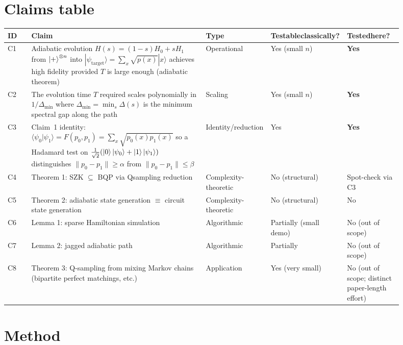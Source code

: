 \documentclass[11pt]{article}
\begin{document}
\section{Claims table}

\begin{longtable}{@{}p{0.06\linewidth}p{0.44\linewidth}p{0.14\linewidth}p{0.12\linewidth}p{0.14\linewidth}@{}}
\toprule
ID & Claim & Type & Testable\newline classically? & Tested\newline here? \\
\midrule
\endhead
C1 & Adiabatic evolution $H(s)=(1-s)H_0 + sH_1$ from $\ket{+}^{\otimes n}$ into
$|\psi_\text{target}\rangle=\sum_x\sqrt{p(x)}|x\rangle$ achieves high fidelity
provided $T$ is large enough (adiabatic theorem) & Operational & Yes (small $n$) & \textbf{Yes} \\
C2 & The evolution time $T$ required scales polynomially in $1/\Delta_\min$
where $\Delta_\min = \min_s\Delta(s)$ is the minimum spectral gap along the path
& Scaling & Yes (small $n$) & \textbf{Yes} \\
C3 & Claim~1 identity: $\langle\psi_0|\psi_1\rangle = F(p_0,p_1) = \sum_x\sqrt{p_0(x)p_1(x)}$
so a Hadamard test on $\tfrac{1}{\sqrt{2}}(\ket{0}\ket{\psi_0}+\ket{1}\ket{\psi_1})$
distinguishes $\|p_0-p_1\|\geq\alpha$ from $\|p_0-p_1\|\leq\beta$
& Identity/reduction & Yes & \textbf{Yes} \\
C4 & Theorem 1: SZK $\subseteq$ BQP via Qsampling reduction & Complexity-theoretic & No (structural) & Spot-check via C3 \\
C5 & Theorem 2: adiabatic state generation $\equiv$ circuit state generation & Complexity-theoretic & No (structural) & No \\
C6 & Lemma 1: sparse Hamiltonian simulation & Algorithmic & Partially (small demo) & No (out of scope) \\
C7 & Lemma 2: jagged adiabatic path & Algorithmic & Partially & No (out of scope) \\
C8 & Theorem 3: Q-sampling from mixing Markov chains (bipartite perfect matchings, etc.) & Application & Yes (very small) & No (out of scope; distinct paper-length effort) \\
\bottomrule
\end{longtable}

\section{Method}
\end{document}
